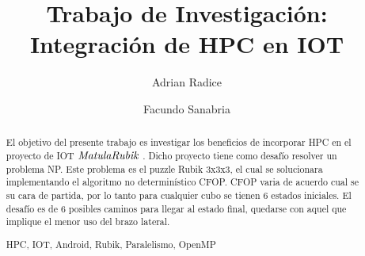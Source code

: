 \documentclass[runningheads,a4paper]{llncs}
\newcommand{\keywords}[1]{\par\addvspace\baselineskip
\noindent\keywordname\enspace\ignorespaces#1}
\newcommand{\MR}{$\emph{MatulaRubik}$ }
\begin{document}
\mainmatter  %

\title{Trabajo de Investigación:\\
Integración de HPC en IOT}


%
%
\author{Adrian Radice%
\and Facundo Sanabria}
%


%
%

\maketitle


\begin{abstract}
El objetivo del presente trabajo es investigar los beneficios de incorporar HPC en el proyecto de IOT
\MR. Dicho proyecto tiene como desafío resolver un problema NP. Este problema es el puzzle Rubik 3x3x3, el cual
se solucionara implementando el algoritmo no determinístico CFOP. CFOP varia de acuerdo cual 
se su cara de partida, por lo tanto para cualquier cubo se tienen 6 estados iniciales. El desafío es de 6 posibles caminos para 
llegar al estado final, quedarse con aquel que implique el menor uso del brazo lateral.
\keywords{HPC, IOT, Android, Rubik, Paralelismo, OpenMP}
\end{abstract}
\end{document}
